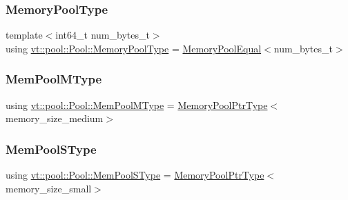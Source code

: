\mbox{\label{structvt_1_1pool_1_1_pool_a06673914350d933ad5205155eca14a3b}} 
\subsubsection{\texorpdfstring{Memory\+Pool\+Type}{MemoryPoolType}}
{\footnotesize\ttfamily template$<$int64\+\_\+t num\+\_\+bytes\+\_\+t$>$ \\
using \hyperlink{structvt_1_1pool_1_1_pool_a06673914350d933ad5205155eca14a3b}{vt\+::pool\+::\+Pool\+::\+Memory\+Pool\+Type} =  \hyperlink{structvt_1_1pool_1_1_memory_pool_equal}{Memory\+Pool\+Equal}$<$num\+\_\+bytes\+\_\+t$>$}

\mbox{\label{structvt_1_1pool_1_1_pool_a8a201b9a843e47cd4e7b568a8e4483da}} 
\subsubsection{\texorpdfstring{Mem\+Pool\+M\+Type}{MemPoolMType}}
{\footnotesize\ttfamily using \hyperlink{structvt_1_1pool_1_1_pool_a8a201b9a843e47cd4e7b568a8e4483da}{vt\+::pool\+::\+Pool\+::\+Mem\+Pool\+M\+Type} =  \hyperlink{structvt_1_1pool_1_1_pool_a21e20f5b56c3bae4f0d0cc36ed9c5eee}{Memory\+Pool\+Ptr\+Type}$<$memory\+\_\+size\+\_\+medium$>$\hspace{0.3cm}{\ttfamily [private]}}

\mbox{\label{structvt_1_1pool_1_1_pool_a9f94985824d12c43357cfe50eaaefd38}} 
\subsubsection{\texorpdfstring{Mem\+Pool\+S\+Type}{MemPoolSType}}
{\footnotesize\ttfamily using \hyperlink{structvt_1_1pool_1_1_pool_a9f94985824d12c43357cfe50eaaefd38}{vt\+::pool\+::\+Pool\+::\+Mem\+Pool\+S\+Type} =  \hyperlink{structvt_1_1pool_1_1_pool_a21e20f5b56c3bae4f0d0cc36ed9c5eee}{Memory\+Pool\+Ptr\+Type}$<$memory\+\_\+size\+\_\+small$>$\hspace{0.3cm}{\ttfamily [private]}}

